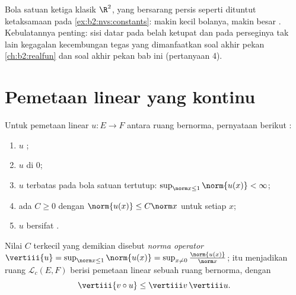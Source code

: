 \begin{omfigure}

{\small Bola satuan ketiga  klasik $\R^2$,
yang bersarang persis seperti dituntut ketaksamaan pada
\cref{ex:b2:nvs:constants}: makin kecil bolanya, makin besar .
Kebulatannya penting: sisi datar pada belah ketupat dan pada perseginya
tak lain kegagalan kecembungan tegas yang dimanfaatkan soal akhir pekan
\cref{ch:b2:realfun} dan soal akhir pekan bab ini (pertanyaan 4).}
\end{omfigure}

\section{Pemetaan linear yang kontinu}

\begin{theorem}[Pencirian]\label{thm:b2:nvs:continuouslinear}
Untuk pemetaan linear $u \colon E \to F$ antara ruang bernorma,
pernyataan berikut :
\begin{enumerate}
  \item $u$ ;
  \item $u$  di $0$;
  \item $u$ terbatas pada bola satuan tertutup: $\sup_{\norm x \leq
        1} \norm{u(x)} < \infty$;
  \item ada $C \geq 0$ dengan $\norm{u(x)} \leq C \norm x$ untuk
        setiap $x$;
  \item $u$ bersifat .
\end{enumerate}
Nilai $C$ terkecil yang demikian disebut \emph{norma
operator} $\vertiii{u} = \sup_{\norm x \leq
1}\norm{u(x)} = \sup_{x \neq 0} \frac{\norm{u(x)}}{\norm x}$;  itu
menjadikan ruang $\mathcal{L}_c(E, F)$ berisi pemetaan linear 
sebuah ruang bernorma, dengan
\[
\vertiii{v \circ u} \leq \vertiii v\, \vertiii u .
\]
\end{theorem}

